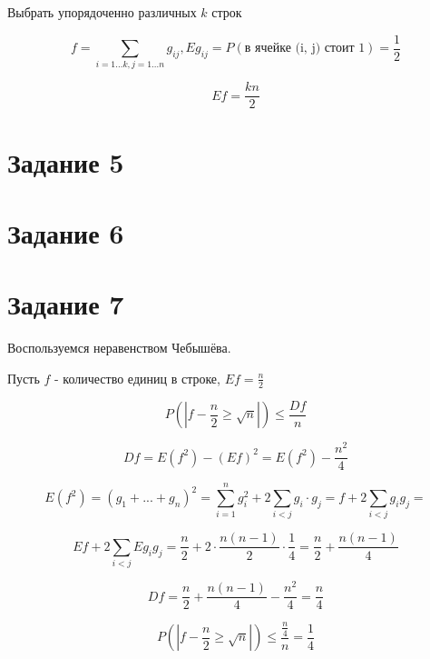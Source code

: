 \documentclass[a4paper]{article}
\newcommand{\Sum}[2]{\sum\limits_{#1}^{#2}}
\newcommand{\task}[1]{\section*{Задание #1}}
\begin{document}
Выбрать упорядоченно различных $k$ строк

$$f = \Sum{i = 1...k, j = 1...n}{} g_{ij}, Eg_{ij} = P(\text{в ячейке (i, j) стоит 1}) = \frac{1}{2}$$

$$Ef = \frac{kn}{2}$$

\task{5}

\task{6}

\task{7}

Воспользуемся неравенством Чебышёва.

Пусть $f$ - количество единиц в строке, $Ef = \frac{n}{2}$

$$P(|f - \frac{n}{2} \geq \sqrt{n}|) \leq \frac{Df}{n}$$

$$Df = E(f^2) - (Ef)^2 = E(f^2) - \frac{n^2}{4}$$

$$E(f^2) = (g_1 + ... + g_n)^2 = \Sum{i = 1}{n} g_i^2 + 2 \Sum{i < j}{} g_i \cdot g_j = f + 2 \Sum{i < j}{} g_i g_j =$$

$$Ef + 2 \Sum{i < j}{} E g_i g_j = \frac{n}{2} + 2 \cdot \frac{n(n - 1)}{2} \cdot \frac{1}{4} = \frac{n}{2} + \frac{n(n - 1)}{4}$$

$$Df = \frac{n}{2} + \frac{n(n - 1)}{4} - \frac{n^2}{4} = \frac{n}{4}$$

$$P(|f - \frac{n}{2} \geq \sqrt{n}|) \leq \frac{\frac{n}{4}}{n} = \frac{1}{4}$$
\end{document}
